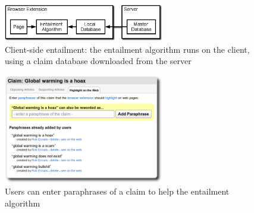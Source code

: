 \documentclass{www2010-submission}
\begin{document}
\begin{figure}[t]
	\begin{center}
	\includegraphics[width=7cm]{pictures/nlp_client_server2.png}
	\caption{Client-side entailment: the entailment algorithm runs on the client, using a claim database downloaded from the server}
	\label{nlp_client_server}
	\end{center}
\end{figure}

\begin{figure}[tb]
	\begin{center}
	\includegraphics[width=7cm]{pictures/paraphrases.png}
	\caption{Users can enter paraphrases of a claim to help the entailment algorithm}
	\label{paraphrases}
	\end{center}
\end{figure}
\end{document}
